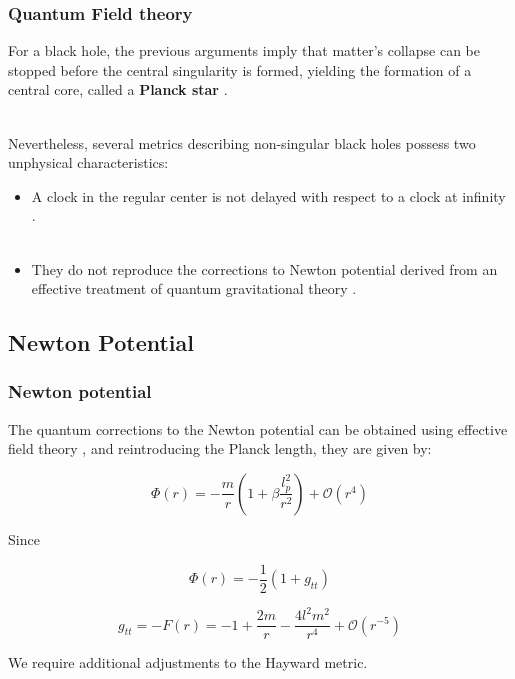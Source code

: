 \documentclass{beamer}
\begin{document}
\begin{frame}
\frametitle{Quantum Field theory}

For a black hole, the previous arguments imply that matter's collapse can be stopped before the central singularity is formed, yielding the formation of a central core, called a \textbf{Planck star} \cite{planck stars}.\\\

Nevertheless, several metrics describing non-singular black holes possess two unphysical characteristics:

\begin{itemize}
\item A clock in the regular center is not delayed with respect to a clock at infinity \cite{planck stars}.\\\

\item They do not reproduce the corrections to Newton potential derived from an effective treatment of quantum gravitational theory \cite{bohr}.
\end{itemize}

\end{frame}


\subsection{Newton Potential}

\begin{frame}
\frametitle{Newton potential}

The quantum corrections to the Newton potential can be obtained using effective field theory \cite{bohr}, and reintroducing the Planck length, they are given by:

\begin{equation}
\Phi (r) = -\frac{m}{r} \left( 1 + \beta \frac{l_{p}^2}{r^2}\right) + \mathcal{O}(r^4)
\end{equation}

Since

\begin{equation}
\Phi (r) = -\frac{1}{2} \left( 1 + g_{tt} \right)
\end{equation}

\begin{equation}
g_{tt} = - F(r) = -1 + \frac{2m}{r} - \frac{4l^2m^2}{r^4} + \mathcal{O}(r^{-5})
\end{equation}

We require additional adjustments to the Hayward metric.

\end{frame}
\end{document}
